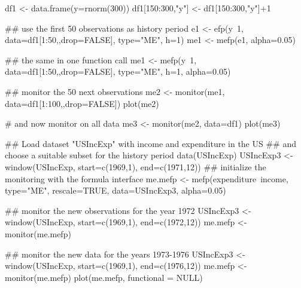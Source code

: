 \begin{Examples}
\begin{ExampleCode}
df1 <- data.frame(y=rnorm(300))
df1[150:300,"y"] <- df1[150:300,"y"]+1

## use the first 50 observations as history period
e1 <- efp(y~1, data=df1[1:50,,drop=FALSE], type="ME", h=1)
me1 <- mefp(e1, alpha=0.05)

## the same in one function call
me1 <- mefp(y~1, data=df1[1:50,,drop=FALSE], type="ME", h=1,
              alpha=0.05)

## monitor the 50 next observations
me2 <- monitor(me1, data=df1[1:100,,drop=FALSE])
plot(me2)

# and now monitor on all data
me3 <- monitor(me2, data=df1)
plot(me3)

## Load dataset "USIncExp" with income and expenditure in the US
## and choose a suitable subset for the history period
data(USIncExp)
USIncExp3 <- window(USIncExp, start=c(1969,1), end=c(1971,12))
## initialize the monitoring with the formula interface
me.mefp <- mefp(expenditure~income, type="ME", rescale=TRUE,
                   data=USIncExp3, alpha=0.05)

## monitor the new observations for the year 1972
USIncExp3 <- window(USIncExp, start=c(1969,1), end=c(1972,12))
me.mefp <- monitor(me.mefp)

## monitor the new data for the years 1973-1976
USIncExp3 <- window(USIncExp, start=c(1969,1), end=c(1976,12))
me.mefp <- monitor(me.mefp)
plot(me.mefp, functional = NULL)
\end{ExampleCode}
\end{Examples}

